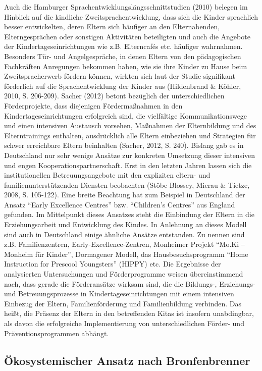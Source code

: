 \documentclass[12pt,a4paper]{article}
\begin{document}
	Auch die Hamburger Sprachentwicklungslängsschnittstudien (2010) belegen im Hinblick auf die kindliche Zweitsprachentwicklung, dass sich die Kinder sprachlich besser entwickelten, deren Eltern sich häufiger an den Elternabenden, Elterngesprächen oder sonstigen Aktivitäten beteiligten und auch die Angebote der Kindertageseinrichtungen wie z.B. Elterncafés etc. häufiger wahrnahmen. Besonders Tür- und Angelgespräche, in denen Eltern von den pädagogischen Fachkräften Anregungen bekommen haben, wie sie ihre Kinder zu Hause beim Zweitspracherwerb fördern können, wirkten sich laut der Studie signifikant förderlich auf die Sprachentwicklung der Kinder aus (Hildenbrand \& Köhler, 2010, S. 206-209).
Sacher (2012) betont bezüglich der unterschiedlichen Förderprojekte, dass diejenigen Fördermaßnahmen in den Kindertageseinrichtungen erfolgreich sind, die vielfältige Kommunikationswege und einen intensiven Austausch vorsehen, Maßnahmen der Elternbildung und des Elterntrainings enthalten, ausdrücklich alle Eltern einbeziehen und Strategien für schwer erreichbare Eltern beinhalten (Sacher, 2012, S. 240). 
	Bislang gab es in Deutschland nur sehr wenige Ansätze zur konkreten Umsetzung dieser intensiven und engen Kooperationspartnerschaft. Erst in den letzten Jahren lassen sich die institutionellen Betreuungsangebote mit den expliziten eltern- und familienunterstützenden Diensten beobachten (Stöbe-Blossey, Mierau \& Tietze, 2008, S. 105-122). Eine breite Beachtung hat zum Beispiel in Deutschland der Ansatz "`Early Excellence Centres"' bzw. "`Children’s Centres"' aus England gefunden. Im Mittelpunkt dieses Ansatzes steht die Einbindung der Eltern in die Erziehungsarbeit und Entwicklung des Kindes. In Anlehnung an dieses Modell sind auch in Deutschland einige ähnliche Ansätze entstanden. Zu nennen sind z.B. Familienzentren, Early-Excellence-Zentren, Monheimer Projekt "`Mo.Ki – Monheim für Kinder"', Dormagener Modell, das Hausbesuchsprogramm "`Home Instruction for Prescool Youngsters"' (HIPPY) etc.
Die Ergebnisse der analysierten Untersuchungen und Förderprogramme weisen übereinstimmend nach, dass gerade die Förderansätze wirksam sind, die die Bildungs-, Erziehungs- und Betreuungsprozesse in Kindertageseinrichtungen mit einem intensiven Einbezug der Eltern, Familienförderung und Familienbildung verbinden. Das heißt, die Präsenz der Eltern in den betreffenden Kitas ist insofern unabdingbar, als davon die erfolgreiche Implementierung von unterschiedlichen Förder- und Präventionsprogrammen abhängt. 

\subsection{Ökosystemischer Ansatz nach Bronfenbrenner} 
\end{document}
